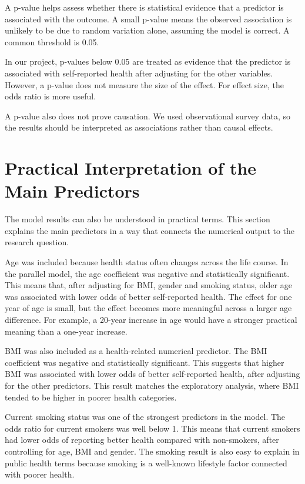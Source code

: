 \documentclass{article}
\begin{document}
A p-value helps assess whether there is statistical evidence that a
predictor is associated with the outcome. A small p-value means the
observed association is unlikely to be due to random variation alone,
assuming the model is correct. A common threshold is 0.05.

In our project, p-values below 0.05 are treated as evidence that the
predictor is associated with self-reported health after adjusting for
the other variables. However, a p-value does not measure the size of the
effect. For effect size, the odds ratio is more useful.

A p-value also does not prove causation. We used observational survey
data, so the results should be interpreted as associations rather than
causal effects.

\section{Practical Interpretation of the Main
Predictors}\label{practical-interpretation-of-the-main-predictors}

The model results can also be understood in practical terms. This
section explains the main predictors in a way that connects the
numerical output to the research question.

Age was included because health status often changes across the life
course. In the parallel model, the age coefficient was negative and
statistically significant. This means that, after adjusting for BMI,
gender and smoking status, older age was associated with lower odds of
better self-reported health. The effect for one year of age is small,
but the effect becomes more meaningful across a larger age difference.
For example, a 20-year increase in age would have a stronger practical
meaning than a one-year increase.

BMI was also included as a health-related numerical predictor. The BMI
coefficient was negative and statistically significant. This suggests
that higher BMI was associated with lower odds of better self-reported
health, after adjusting for the other predictors. This result matches
the exploratory analysis, where BMI tended to be higher in poorer health
categories.

Current smoking status was one of the strongest predictors in the model.
The odds ratio for current smokers was well below 1. This means that
current smokers had lower odds of reporting better health compared with
non-smokers, after controlling for age, BMI and gender. The smoking
result is also easy to explain in public health terms because smoking is
a well-known lifestyle factor connected with poorer health.
\end{document}
